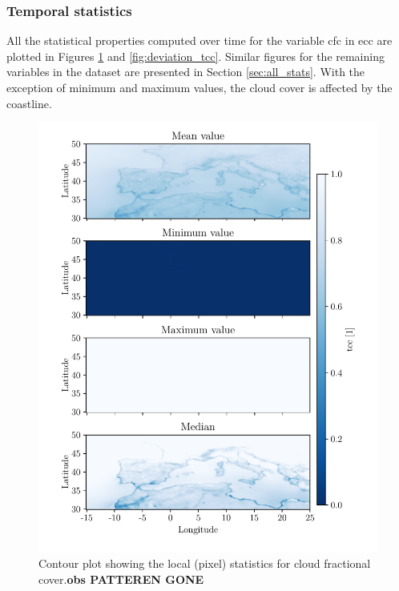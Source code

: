 \subsubsection{Temporal statistics}
All the statistical properties computed over time for the variable \acrshort{cfc} in \acrshort{ecc} are plotted in 
Figures \ref{fig:all_stats_tcc} and \ref{fig:deviation_tcc}. Similar figures for the remaining variables in the dataset are presented in Section \ref{sec:all_stats}. 
With the exception of minimum and maximum values, the cloud cover is affected by the coastline. 
\begin{figure}[ht]
    \centering
    \includegraphics{python_figs/all_stat_variable_tcc.pdf}
    \caption{Contour plot showing the local (pixel) statistics for cloud fractional cover.\textbf{obs PATTEREN GONE}}
    \label{fig:all_stats_tcc}
\end{figure}
